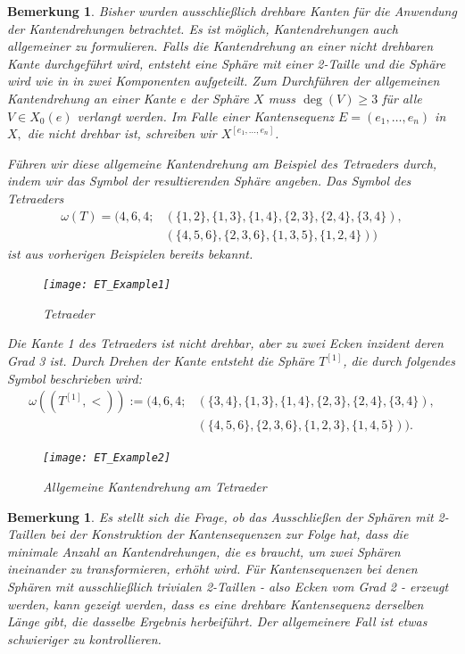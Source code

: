 \documentclass[12pt,titlepage,twoside,cleardoublepage]{article}
\theoremstyle{nummermitklammern}
\newtheorem{bemerkung}[temp]{Bemerkung}
\newtheorem{bemerkung}[zahl]{Bemerkung}
\numberwithin{equation}{section}
\begin{document}
\begin{bemerkung}
Bisher wurden ausschließlich drehbare Kanten für die Anwendung der Kantendrehungen betrachtet. Es ist möglich, Kantendrehungen auch allgemeiner zu formulieren. Falls die Kantendrehung an einer nicht drehbaren Kante durchgeführt wird, entsteht eine Sphäre mit einer 2-Taille und die Sphäre wird wie in  in zwei Komponenten aufgeteilt.  Zum Durchführen der allgemeinen Kantendrehung an einer Kante $e$ der Sphäre $X$ muss $\deg(V)\geq 3$ für alle $V\in X_0(e)$ verlangt werden. Im Falle einer Kantensequenz $E=(e_1,\ldots,e_n)$ in $X,$ die nicht drehbar ist, schreiben wir $X^{[e_1,\ldots,e_n]}$.

 Führen wir diese allgemeine Kantendrehung am Beispiel des Tetraeders durch, indem wir das Symbol der resultierenden Sphäre angeben. Das Symbol des Tetraeders
\begin{align*}
\omega(T)=(4,6,4;&(\{1,2\}, \{1,3\},\{1,4\},\{2,3\},\{2,4\},\{3,4\}),\\
&(\{4,5,6\},\{2,3,6\},\{1,3,5\},\{1,2,4\}))
\end{align*} ist aus vorherigen Beispielen bereits bekannt.
\begin{figure}[H]
\begin{center}
\texttt{[image: ET\_Example1]}
\end{center}
\caption{Tetraeder}
\end{figure}
Die Kante 1 des Tetraeders ist nicht drehbar, aber zu zwei Ecken inzident deren Grad 3 ist. Durch Drehen der Kante entsteht die Sphäre $T^{[1]}$, die durch folgendes Symbol beschrieben wird:
\begin{align*}
\omega((T^{[1]},<)):=(4,6,4;&(\{3,4\},\{1,3\},\{1,4\},\{2,3\},\{2,4\},\{3,4\}),\\
&(\{4,5,6\},\{2,3,6\},\{1,2,3\},\{1,4,5\})).
\end{align*}
\begin{figure}[H]
\begin{center}
\texttt{[image: ET\_Example2]}
\end{center}
\caption{Allgemeine Kantendrehung am Tetraeder}
\end{figure}

\end{bemerkung}

\begin{bemerkung}
Es stellt sich die Frage, ob das Ausschließen der Sphären mit 2-Taillen bei der Konstruktion der Kantensequenzen zur Folge hat, dass die minimale Anzahl an Kantendrehungen, die es braucht, um zwei Sphären ineinander zu transformieren, erhöht wird. Für Kantensequenzen bei denen Sphären mit ausschließlich trivialen 2-Taillen - also Ecken vom Grad 2 -  erzeugt werden, kann gezeigt werden, dass es eine drehbare Kantensequenz derselben Länge gibt, die dasselbe Ergebnis herbeiführt. Der allgemeinere Fall ist etwas schwieriger zu kontrollieren.
\end{bemerkung}
\end{document}
